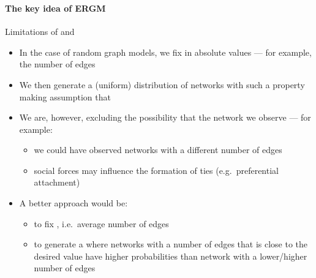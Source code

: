 \documentclass[8pt]{beamer}
\begin{document}

\begin{frame}
\frametitle{\insertsection}
\framesubtitle{The key idea of ERGM}

Limitations of {\color{blue}{random graph models}} and {\color{blue}{the key idea of ERGM}}

\begin{itemize}

\item In the case of random graph models, we fix {\color{blue}{a network property}} in absolute values --- for example, the number of edges 

\item We then generate a (uniform) distribution of networks with such a property making assumption that {\color{blue}{ties between nodes occur at random}}

\item We are, however, excluding the possibility that the network we observe {\color{blue}{may have been different}} --- for example:
 	\begin{itemize}
 	\item we could have observed networks with a different number of edges
 	\item social forces may influence the formation of ties (e.g.\ preferential attachment)
 	\end{itemize}

\item A better approach would be: 
 \begin{itemize}
 \item to fix {\color{blue}{the average value of the network property}}, i.e.\ average number of edges
 \item to generate a {\color{blue}{distribution of networks}} where networks with a number of edges that is close to the desired value have higher probabilities than network with a lower/higher number of edges
 \end{itemize}
 
\end{itemize}

\end{frame}

\end{document}

